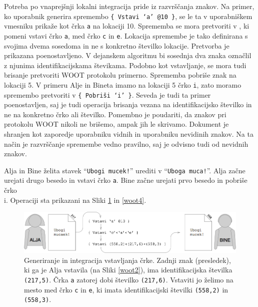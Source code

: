 \documentclass[a4paper, 12pt, twoside]{book}
\begin{document}
Potreba po vnaprejšnji lokalni integracija pride iz razvrščanja znakov. Na primer, ko uporabnik generira spremembo {\tt \{ Vstavi ‘a’ @10 \}}, se le ta v uporabniškem vmesniku prikaže kot črka {\tt a} na lokaciji 10. Sprememba se mora pretvoriti v , ki pomeni vstavi črko {\tt a}, med črko {\tt c} in {\tt e}. Lokacija spremembe je tako definirana s svojima dvema sosedoma in ne s konkretno številko lokacije. Pretvorba je prikazana poenostavljeno. V dejanskem algoritmu bi sosednja dva znaka označlil z njunima identifikacijskama števikama. Podobno kot vstavljanje, se mora tudi brisanje pretvoriti WOOT protokolu primerno. Sprememba  pobriše znak na lokaciji 5. V primeru Alje in Bineta imamo na lokaciji 5 črko {\tt i}, zato moramo spremembo pretvoriti v {\tt \{ Pobriši ‘i’ \}}. Seveda je tudi ta primer poenostavljen, saj je tudi operacija brisanja vezana na identifikacijsko številko in ne na konkretno črko ali številko. Pomembno je poudariti, da znakov pri protokolu WOOT nikoli ne brišemo, ampak jih le skrivamo. Dokument je shranjen kot zaporedje uporabniku vidnih in uporabniku nevidinih znakov. Na ta način je razvrščanje spremembe vedno pravilno, saj je odvisno tudi od nevidnih znakov.

Alja in Bine želita stavek “{\tt Ubogi mucek!}” urediti v “{\tt Uboga muca!}”. Alja začne urejati drugo besedo in vstavi črko {\tt a}. Bine začne urejati prvo besedo in pobriše črko {\\ i}. Operaciji sta prikazani na Sliki \ref{woot3} in \ref{woot4}.

\begin{figure}[placement h]
\begin{center}
\includegraphics[width=13cm]{woot3.png}
\end{center}
\caption{Generiranje in integracija vstavljanja črke. Zadnji znak (presledek), ki ga je Alja vstavila (na Sliki \ref{woot2}), ima identifikacijska številka {\tt (217,5)}. Črka {\tt a} zatorej dobi številko {\tt (217,6)}. Vstaviti jo želimo na mesto med črko {\tt c} in {\tt e}, ki imata identifikacijski številki {\tt (558,2)} in {\tt (558,3)}.}
\label{woot3}
\end{figure}
\end{document}

